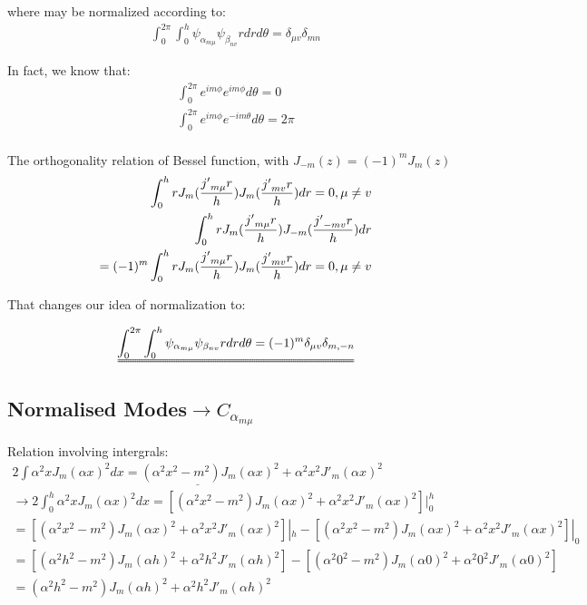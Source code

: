 \documentclass{Note}
\begin{document}
where may be normalized according to:
\begin{equation}
\begin{aligned}
\int_0^{2\pi}\int_0^h \psi_{\alpha_{m\mu}} \psi_{\beta_{nv}} r dr d\theta=\delta_{\mu v} \delta_{mn}
\end{aligned}
\end{equation}


In fact, we know that:
\begin{equation}
\begin{aligned}
\int_0^{2\pi} e^{im\phi}e^{im\phi}  d\theta=0\\
\int_0^{2\pi} e^{im\phi}e^{-im\theta}  d\theta=2\pi\\
\end{aligned}
\end{equation}


The orthogonality relation of Bessel function, with $J_{-m}(z)=(-1)^m J_m(z)$
\begin{equation}
\begin{aligned}
\int_0^h r J_m({{j'}_{m\mu} r\over h})J_m({{j'}_{mv} r\over h}) dr=0,\mu\neq v\\
\int_0^h r J_m({{j'}_{m\mu} r\over h})J_{-m}({{j'}_{-mv} r\over h}) dr\\=(-1)^m \int_0^h r J_m({{j'}_{m\mu} r\over h})J_{m}({{j'}_{mv} r\over h}) dr=0,\mu\neq v\\
\end{aligned}
\end{equation}

That changes our idea of normalization to:


\begin{equation}
\begin{aligned}
\uuline{\int_0^{2\pi}\int_0^h \psi_{\alpha_{m\mu}} \psi_{\beta_{nv}} r dr d\theta=(-1)^m\delta_{\mu v} \delta_{m,-n}}
\end{aligned}
\end{equation}



\subsection{Normalised Modes$\rightarrow C_{\alpha_{m\mu}}$}


Relation involving intergrals:
\begin{equation}
\begin{aligned}
\underline{2\int \alpha^2 x J_m(\alpha x)^2 dx=(\alpha^2x^2-m^2)J_m(\alpha x)^2+\alpha^2 x^2 J'_m(\alpha x)^2}\\
\rightarrow 2\int_0^h \alpha^2 x J_m(\alpha x)^2 dx=[(\alpha^2x^2-m^2)J_m(\alpha x)^2+\alpha^2 x^2 J'_m(\alpha x)^2]|_0^h\\=[(\alpha^2x^2-m^2)J_m(\alpha x)^2+\alpha^2 x^2 J'_m(\alpha x)^2]|_h-[(\alpha^2x^2-m^2)J_m(\alpha x)^2+\alpha^2 x^2 J'_m(\alpha x)^2]|_0\\
=[(\alpha^2h^2-m^2)J_m(\alpha h)^2+\alpha^2 h^2 J'_m(\alpha h)^2]-[(\alpha^2 0^2-m^2)J_m(\alpha 0)^2+\alpha^2 0^2 J'_m(\alpha 0)^2]\\
=
(\alpha^2h^2-m^2)J_m(\alpha h)^2+\alpha^2 h^2 J'_m(\alpha h)^2
\end{aligned}
\end{equation}
\end{document}
